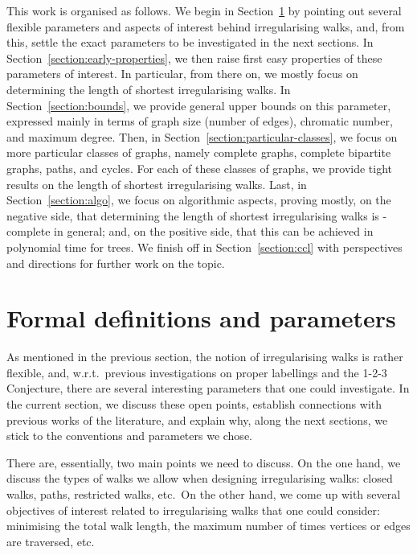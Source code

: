 \documentclass[a4paper,11pt,dvipsnames]{elsarticle}
\newcommand{\sam}[1]{\todo[size=\tiny,color=red!20!white]{\textbf{Sam:} #1}}
\newcommand{\sam}[1]{}
\begin{document}
This work is organised as follows.
We begin in Section~\ref{section:def} by pointing out several flexible parameters and aspects of interest behind irregularising walks,
and, from this, settle the exact parameters to be investigated in the next sections. In Section~\ref{section:early-properties}, we then raise first easy properties of these parameters of interest. In particular, from there on, we mostly focus on determining the length of shortest irregularising walks. In Section~\ref{section:bounds}, we provide general upper bounds on this parameter, expressed mainly in terms of graph size (number of edges),
chromatic number, and maximum degree. Then, in Section~\ref{section:particular-classes}, we focus on more particular classes of graphs, namely complete graphs, complete bipartite graphs, paths, and cycles. For each of these classes of graphs, we provide tight results on the length of shortest irregularising walks. Last, in Section~\ref{section:algo}, we focus on algorithmic aspects, proving mostly, on the negative side, that determining the length of shortest irregularising walks is \np-complete in general; and, on the positive side, that this can be achieved in polynomial time for trees. We finish off in Section~\ref{section:ccl} with perspectives and directions for further work on the topic.

\section{Formal definitions and parameters}\label{section:def}

As mentioned in the previous section, the notion of irregularising walks is rather flexible,
and, w.r.t.~previous investigations on proper labellings and the 1-2-3 Conjecture,
there are several interesting parameters that one could investigate.
In the current section, we discuss these open points, establish connections with previous works of the literature,
and explain why, along the next sections, we stick to the conventions and parameters we chose.

There are, essentially, two main points we need to discuss.
On the one hand, we discuss the types of walks we allow when designing irregularising walks:
closed walks, paths, restricted walks, etc.~On the other hand, we come up with several objectives of interest related to irregularising walks that one could consider:
minimising the total walk length, the maximum number of times vertices or edges are traversed, etc.
\end{document}
